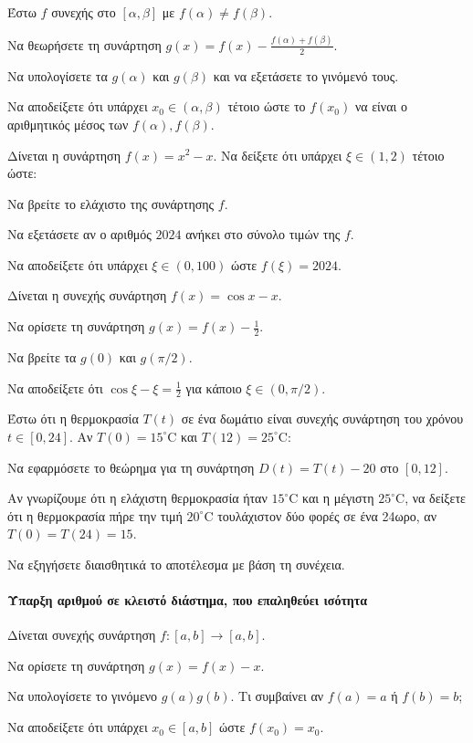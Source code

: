 \documentclass[11pt,a4paper,modern]{FFExercises}
\begin{document}
\askhsh
Έστω $f$ συνεχής στο $[\alpha, \beta]$ με $f(\alpha) \ne f(\beta)$.
\begin{alist}
    \item Να θεωρήσετε τη συνάρτηση $g(x) = f(x) - \frac{f(\alpha)+f(\beta)}{2}$.
    \item Να υπολογίσετε τα $g(\alpha)$ και $g(\beta)$ και να εξετάσετε το γινόμενό τους.
    \item Να αποδείξετε ότι υπάρχει $x_0 \in (\alpha, \beta)$ τέτοιο ώστε το $f(x_0)$ να είναι ο αριθμητικός μέσος των $f(\alpha), f(\beta)$.
\end{alist}

\askhsh
Δίνεται η συνάρτηση $f(x) = x^2 - x$. Να δείξετε ότι υπάρχει $\xi \in (1,2)$ τέτοιο ώστε:
\begin{alist}
    \item Να βρείτε το ελάχιστο της συνάρτησης $f$.
    \item Να εξετάσετε αν ο αριθμός $2024$ ανήκει στο σύνολο τιμών της $f$.
    \item Να αποδείξετε ότι υπάρχει $\xi \in (0, 100)$ ώστε $f(\xi) = 2024$.
\end{alist}

\askhsh
Δίνεται η συνεχής συνάρτηση $f(x)=\cos x - x$.
\begin{alist}
    \item Να ορίσετε τη συνάρτηση $g(x) = f(x) - \frac{1}{2}$.
    \item Να βρείτε τα $g(0)$ και $g(\pi/2)$.
    \item Να αποδείξετε ότι $\cos \xi - \xi = \frac{1}{2}$ για κάποιο $\xi \in (0, \pi/2)$.
\end{alist}

\askhsh
Έστω ότι η θερμοκρασία $T(t)$ σε ένα δωμάτιο είναι συνεχής συνάρτηση του χρόνου $t \in [0, 24]$. Αν $T(0)=15^{\circ}$C και $T(12)=25^{\circ}$C:
\begin{alist}
    \item Να εφαρμόσετε το θεώρημα  για τη συνάρτηση $D(t) = T(t) - 20$ στο $[0, 12]$.
    \item Αν γνωρίζουμε ότι η ελάχιστη θερμοκρασία ήταν $15^\circ$C και η μέγιστη $25^\circ$C, να δείξετε ότι η θερμοκρασία πήρε την τιμή $20^\circ$C τουλάχιστον δύο φορές σε ένα 24ωρο, αν $T(0)=T(24)=15$.
    \item Να εξηγήσετε διαισθητικά το αποτέλεσμα με βάση τη συνέχεια.
\end{alist}
\paragraph{Ύπαρξη αριθμού σε κλειστό διάστημα, που επαληθεύει ισότητα}
\askhsh
Δίνεται συνεχής συνάρτηση $f: [a,b] \to [a,b]$.
\begin{alist}
    \item Να ορίσετε τη συνάρτηση $g(x)=f(x)-x$.
    \item Να υπολογίσετε το γινόμενο $g(a)g(b)$. Τι συμβαίνει αν $f(a)=a$ ή $f(b)=b$;
    \item Να αποδείξετε ότι υπάρχει $x_0 \in [a,b]$ ώστε $f(x_0)=x_0$.
\end{alist}
\end{document}
